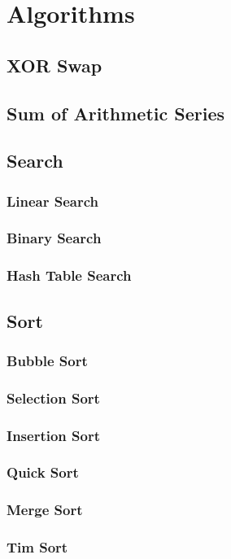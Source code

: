 \chapter{Algorithms}%
\section{XOR Swap}

\section{Sum of Arithmetic Series}

\section{Search}
\subsection{Linear Search}

\subsection{Binary Search}

\subsection{Hash Table Search}

\section{Sort}
\subsection{Bubble Sort}

\subsection{Selection Sort}

\subsection{Insertion Sort}

\subsection{Quick Sort}

\subsection{Merge Sort}

\subsection{Tim Sort}

